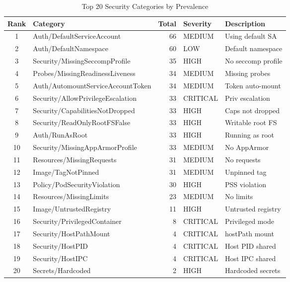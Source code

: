 \documentclass[preprint,12pt]{elsarticle}
\begin{document}
\begin{table}[htbp]
\centering
\caption{Top 20 Security Categories by Prevalence}
\label{tab:top_categories}
\small
\setlength{\tabcolsep}{4pt}
\renewcommand{\arraystretch}{1.08}
\begin{tabular}{clrll}
\hline
\textbf{Rank} & \textbf{Category} & \textbf{Total} & \textbf{Severity} & \textbf{Description} \\
\hline
1 & Auth/DefaultServiceAccount & 66 & MEDIUM & Using default SA \\
2 & Auth/DefaultNamespace & 60 & LOW & Default namespace \\
3 & Security/MissingSeccompProfile & 35 & HIGH & No seccomp profile \\
4 & Probes/MissingReadinessLiveness & 34 & MEDIUM & Missing probes \\
5 & Auth/AutomountServiceAccountToken & 34 & MEDIUM & Token auto-mount \\
6 & Security/AllowPrivilegeEscalation & 33 & CRITICAL & Priv escalation \\
7 & Security/CapabilitiesNotDropped & 33 & HIGH & Caps not dropped \\
8 & Security/ReadOnlyRootFSFalse & 33 & HIGH & Writable root FS \\
9 & Auth/RunAsRoot & 33 & HIGH & Running as root \\
10 & Security/MissingAppArmorProfile & 33 & MEDIUM & No AppArmor \\
11 & Resources/MissingRequests & 31 & MEDIUM & No requests \\
12 & Image/TagNotPinned & 31 & MEDIUM & Unpinned tag \\
13 & Policy/PodSecurityViolation & 30 & HIGH & PSS violation \\
14 & Resources/MissingLimits & 23 & MEDIUM & No limits \\
15 & Image/UntrustedRegistry & 11 & HIGH & Untrusted registry \\
16 & Security/PrivilegedContainer & 8 & CRITICAL & Privileged mode \\
17 & Security/HostPathMount & 4 & CRITICAL & hostPath mount \\
18 & Security/HostPID & 4 & CRITICAL & Host PID shared \\
19 & Security/HostIPC & 4 & CRITICAL & Host IPC shared \\
20 & Secrets/Hardcoded & 2 & HIGH & Hardcoded secrets \\
\hline
\end{tabular}
\end{table}
\end{document}
